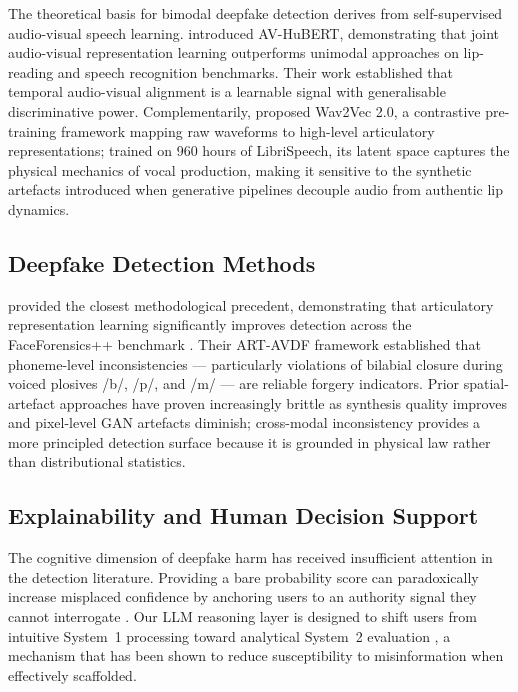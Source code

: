 \documentclass[12pt]{article}
\begin{document}
The theoretical basis for bimodal deepfake detection derives from self-supervised
audio-visual speech learning.
\citet{shi2022avhubert} introduced AV-HuBERT, demonstrating that joint
audio-visual representation learning outperforms unimodal approaches on
lip-reading and speech recognition benchmarks.
Their work established that temporal audio-visual alignment is a learnable signal
with generalisable discriminative power.
Complementarily, \citet{baevski2020} proposed Wav2Vec 2.0, a contrastive
pre-training framework mapping raw waveforms to high-level articulatory
representations; trained on 960 hours of LibriSpeech, its latent space captures
the physical mechanics of vocal production, making it sensitive to the synthetic
artefacts introduced when generative pipelines decouple audio from authentic lip
dynamics.

\subsection{Deepfake Detection Methods}

\citet{wang2024artavdf} provided the closest methodological precedent,
demonstrating that articulatory representation learning significantly improves
detection across the FaceForensics++ benchmark \citep{rossler2019}.
Their ART-AVDF framework established that phoneme-level inconsistencies ---
particularly violations of bilabial closure during voiced plosives /b/, /p/, and
/m/ --- are reliable forgery indicators.
Prior spatial-artefact approaches \citep{rossler2019} have proven increasingly
brittle as synthesis quality improves and pixel-level GAN artefacts diminish;
cross-modal inconsistency provides a more principled detection surface because it
is grounded in physical law rather than distributional statistics.

\subsection{Explainability and Human Decision Support}

The cognitive dimension of deepfake harm has received insufficient attention in
the detection literature.
Providing a bare probability score can paradoxically increase misplaced
confidence by anchoring users to an authority signal they cannot interrogate
\citep{abercrombie2024}.
Our LLM reasoning layer is designed to shift users from intuitive System~1
processing toward analytical System~2 evaluation \citep{kahneman2011}, a
mechanism that has been shown to reduce susceptibility to misinformation when
effectively scaffolded.
\end{document}

